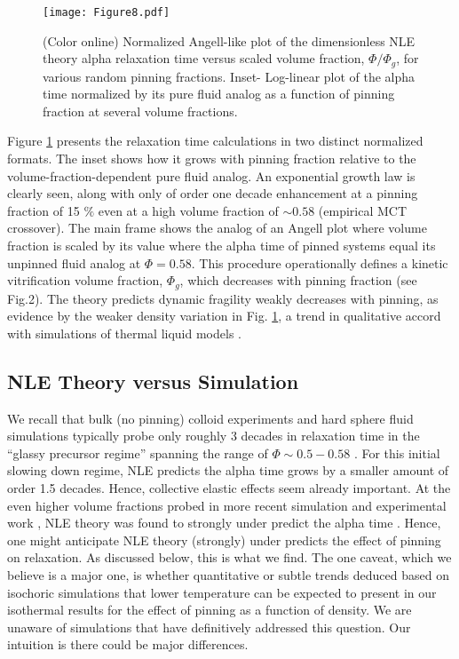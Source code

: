 \documentclass[twocolumn,showpacs,preprintnumbers,amsmath,amssymb,unsortedaddress,
]{revtex4-1}
\begin{document}
\begin{figure}[htp]
\center
\texttt{[image: Figure8.pdf]}
\caption{\label{fig:8}(Color online) Normalized Angell-like plot of the dimensionless NLE theory alpha relaxation time versus scaled volume fraction, $\Phi/\Phi_g$, for various random pinning fractions. Inset- Log-linear plot of the alpha time normalized by its pure fluid analog as a function of pinning fraction at several volume fractions.}
\end{figure}

Figure \ref{fig:8} presents the relaxation time calculations in two distinct normalized formats. The inset shows how it grows with pinning fraction relative to the volume-fraction-dependent pure fluid analog. An exponential growth law is clearly seen, along with only of order one decade enhancement at a pinning fraction of 15 $\%$ even at a high volume fraction of $\sim 0.58$ (empirical MCT crossover). The main frame shows the analog of an Angell plot where volume fraction is scaled by its value where the alpha time of pinned systems equal its unpinned fluid analog at $\Phi = 0.58$. This procedure operationally defines a kinetic vitrification volume fraction, $\Phi_g$, which decreases with pinning fraction (see Fig.2). The theory predicts dynamic fragility weakly decreases with pinning, as evidence by the weaker density variation in Fig. \ref{fig:8}, a trend in  qualitative accord with simulations of thermal liquid models \cite{25,28}. 

\subsection{NLE Theory versus Simulation}
We recall that bulk (no pinning) colloid experiments and hard sphere fluid simulations typically probe only roughly 3 decades in relaxation time in the “glassy precursor regime” spanning the range of $\Phi\sim 0.5-0.58$ \cite{1,3}. For this initial slowing down regime, NLE predicts the alpha time grows by a smaller amount of order 1.5 decades. Hence, collective elastic effects seem already important. At the even higher volume fractions probed in more recent simulation and experimental work \cite{47}, NLE theory was found to strongly under predict the alpha time \cite{7,8,30,48}. Hence, one might anticipate NLE theory (strongly) under predicts the effect of pinning on relaxation. As discussed below, this is what we find. The one caveat, which we believe is a major one, is whether quantitative or subtle trends deduced based on isochoric simulations that lower temperature can be expected to present in our isothermal results for the effect of pinning as a function of density. We are unaware of simulations that have definitively addressed this question. Our intuition is there could be major differences.
\end{document}
